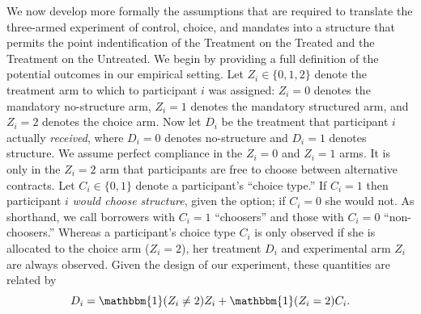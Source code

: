 \documentclass[12pt, a4paper, colorinlistoftodos]{article}
\begin{document}
We now develop more formally the assumptions that are required to translate the three-armed experiment of control, choice, and mandates into a structure that permits the point indentification of the Treatment on the Treated and the Treatment on the Untreated.  
We begin by providing a full definition of the potential outcomes in our empirical setting. Let $Z_i \in \{0, 1, 2\}$ denote the treatment arm to which to participant $i$ was assigned: $Z_i = 0$ denotes the mandatory no-structure arm, $Z_i = 1$ denotes the mandatory structured arm, and $Z_i = 2$ denotes the choice arm. 
Now let $D_i$ be the treatment that participant $i$ actually \emph{received}, where $D_i = 0$ denotes no-structure and $D_i = 1$ denotes structure. 
We assume perfect compliance in the $Z_i = 0$ and $Z_i = 1$ arms. %
It is only in the $Z_i = 2$ arm that participants are free to choose between alternative contracts. 
Let $C_i \in \{0, 1 \}$ denote a participant's ``choice type.'' If $C_i = 1$ then participant $i$ \emph{would choose structure}, given the option; if $C_i = 0$ she would not. 
As shorthand, we call borrowers with $C_i = 1$ ``choosers'' and those with $C_i = 0$ ``non-choosers.''
Whereas a participant's choice type $C_i$ is only observed if she is allocated to the choice arm ($Z_i = 2$), her treatment $D_i$ and experimental arm $Z_i$ are always observed. 
Given the design of our experiment, these quantities are related by
\begin{equation}
D_i = \mathbbm{1}(Z_i \neq 2) Z_i + \mathbbm{1}(Z_i = 2) C_i.
\label{eq:potentialTreatments}
\end{equation}
\end{document}
